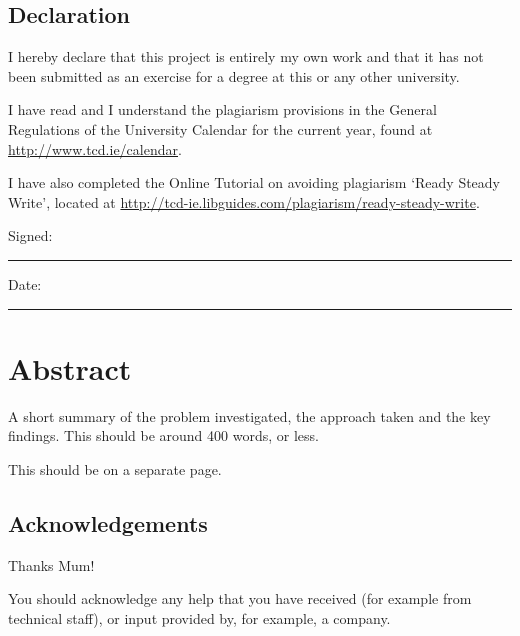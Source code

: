 \documentclass[a4paper,oneside,12pt]{book}
\title{\thesistitle}
\author{\authorname}
\begin{document}

\section*{\Huge{Declaration}}
\vspace{1cm}
I hereby declare that this project is entirely my own work and that it has not been submitted as an exercise for a degree at this or any other university.

\vspace{1cm}
I have read and I understand the plagiarism provisions in the General Regulations of the University Calendar for the current year, found at \url{http://www.tcd.ie/calendar}.
\vspace{1cm}

I have also completed the Online Tutorial on avoiding plagiarism `Ready Steady Write', located at
\url{http://tcd-ie.libguides.com/plagiarism/ready-steady-write}.
\vspace{3cm}

Signed:~\rule{5cm}{0.3pt}\hfill Date:~\rule{5cm}{0.3pt}

\chapter*{Abstract}
A short summary of the problem investigated, the approach taken and the key findings. This should be around 400 words, or less.

This should be on a separate page.

\newpage
\onehalfspacing\raggedright %

\section*{\Huge{Acknowledgements}}
Thanks Mum!

You should acknowledge any help that you have received (for example from technical staff), or input provided by, for example, a company.
\tableofcontents
\listoffigures
\listoftables
\newpage
\end{document}
